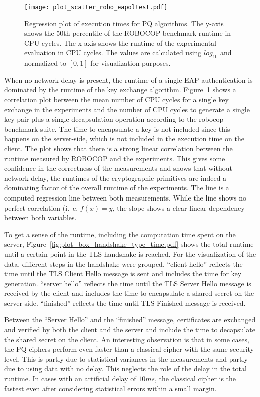 \begin{figure}[t]
    \centering\texttt{[image: plot\_scatter\_robo\_eapoltest.pdf]}
    \caption{Regression plot of execution times for \ac{PQ} algorithms. The y-axis shows the 50th percentile of the ROBOCOP benchmark runtime in CPU cycles. The x-axis shows the runtime of the experimental evaluation in CPU cycles. The values are calculated using \(log_{10}\) and normalized to \([0,1]\) for visualization purposes.}\label{fig:plot_scatter_robo_eapoltest.pdf}
\end{figure}


When no network delay is present, the runtime of a single \ac{EAP} authentication is dominated by the runtime of the key exchange algorithm. Figure~\ref{fig:plot_scatter_robo_eapoltest.pdf} shows a correlation plot between the mean number of CPU cycles for a single key exchange in the experiments and the number of CPU cycles to generate a single key pair plus a single decapsulation operation according to the robocop benchmark suite. The time to encapsulate a key is not included since this happens on the server-side, which is not included in the execution time on the client. The plot shows that there is a strong linear correlation between the runtime measured by ROBOCOP and the experiments. This gives some confidence in the correctness of the measurements and shows that without network delay, the runtimes of the cryptographic primitives are indeed a dominating factor of the overall runtime of the experiments. The line is a computed regression line between both measurements. While the line shows no perfect correlation (i.~e. \(f(x) = y\), the slope shows a clear linear dependency between both variables.

To get a sense of the runtime, including the computation time spent on the server, Figure~\ref{fig:plot_box_handshake_type_time.pdf} shows the total runtime until a certain point in the TLS handshake is reached. For the visualization of the data, different steps in the handshake were grouped. ``client hello'' reflects the time until the TLS Client Hello message is sent and includes the time for key generation. ``server hello'' reflects the time until the TLS Server Hello message is received by the client and includes the time to encapsulate a shared secret on the server-side. ``finished'' reflects the time until TLS Finished message is received. 


Between the ``Server Hello'' and the ``finished'' message, certificates are exchanged and verified by both the client and the server and include the time to decapsulate the shared secret on the client. An interesting observation is that in some cases, the \ac{PQ} ciphers perform even faster than a classical cipher with the same security level. This is partly due to statistical variances in the measurements and partly due to using data with no delay. This neglects the role of the delay in the total runtime. In cases with an artificial delay of \(10ms\), the classical cipher is the fastest even after considering statistical errors within a small margin.

